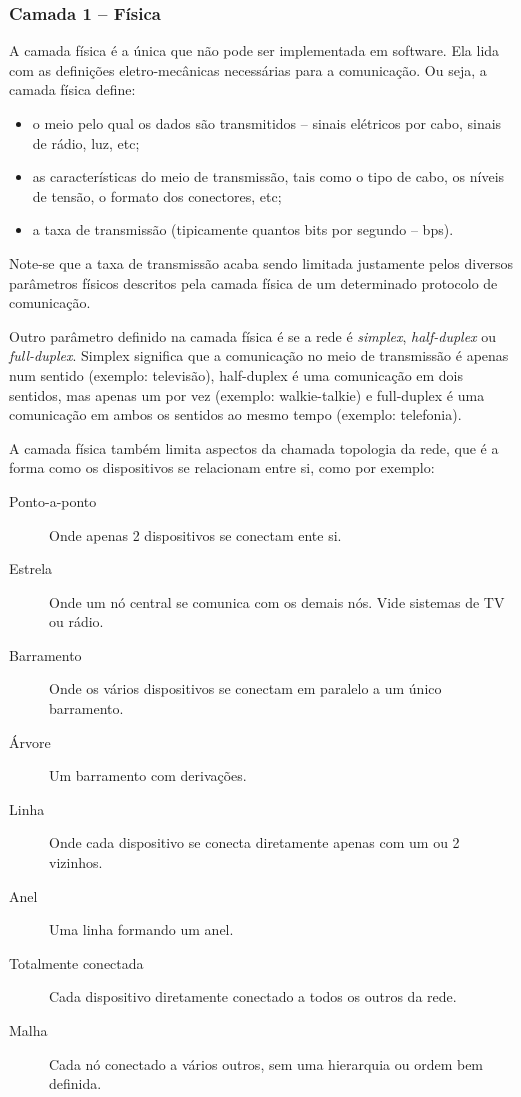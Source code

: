 \subsubsection{Camada 1 -- Física}
	A camada física é a única que não pode ser implementada em software. Ela lida com as definições eletro-mecânicas necessárias para a comunicação. Ou seja, a camada física define:
	\begin{itemize}
		\item o meio pelo qual os dados são transmitidos -- sinais elétricos por cabo, sinais de rádio, luz, etc;
		\item as características do meio de transmissão, tais como o tipo de cabo, os níveis de tensão, o formato dos conectores, etc;
		\item a taxa de transmissão (tipicamente quantos bits por segundo -- bps).
	\end{itemize}
	Note-se que a taxa de transmissão acaba sendo limitada justamente pelos diversos parâmetros físicos descritos pela camada física de um determinado protocolo de comunicação.

Outro parâmetro definido na camada física é se a rede é \emph{simplex}, \emph{half-duplex} ou \emph{full-duplex}. Simplex significa que a comunicação no meio de transmissão é apenas num sentido (exemplo: televisão), half-duplex é uma comunicação em dois sentidos, mas apenas um por vez (exemplo: walkie-talkie) e full-duplex é uma comunicação em ambos os sentidos ao mesmo tempo (exemplo: telefonia).

A camada física também limita aspectos da chamada topologia da rede, que é a forma como os dispositivos se relacionam entre si, como por exemplo:
\begin{description}
	\item[Ponto-a-ponto] Onde apenas 2 dispositivos se conectam ente si.
	\item[Estrela] Onde um nó central se comunica com os demais nós. Vide sistemas de TV ou rádio.
	\item[Barramento] Onde os vários dispositivos se conectam em paralelo a um único barramento.
	\item[Árvore] Um barramento com derivações.
	\item[Linha] Onde cada dispositivo se conecta diretamente apenas com um ou 2 vizinhos.
	\item[Anel] Uma linha formando um anel.
	\item[Totalmente conectada] Cada dispositivo diretamente conectado a todos os outros da rede.
	\item[Malha] Cada nó conectado a vários outros, sem uma hierarquia ou ordem bem definida.
\end{description}

